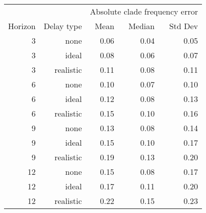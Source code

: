 
\begin{tabular*}{0.7\textwidth}{rrrrr}
\toprule
        &            & \multicolumn{3}{c}{Absolute clade frequency error} \\
Horizon & Delay type & Mean & Median & Std Dev \\
\midrule

3 & none & 0.06 & 0.04 & 0.05 \\
3 & ideal & 0.08 & 0.06 & 0.07 \\
3 & realistic & 0.11 & 0.08 & 0.11 \\
6 & none & 0.10 & 0.07 & 0.10 \\
6 & ideal & 0.12 & 0.08 & 0.13 \\
6 & realistic & 0.15 & 0.10 & 0.16 \\
9 & none & 0.13 & 0.08 & 0.14 \\
9 & ideal & 0.15 & 0.10 & 0.17 \\
9 & realistic & 0.19 & 0.13 & 0.20 \\
12 & none & 0.15 & 0.08 & 0.17 \\
12 & ideal & 0.17 & 0.11 & 0.20 \\
12 & realistic & 0.22 & 0.15 & 0.23 \\

\bottomrule
\end{tabular*}

